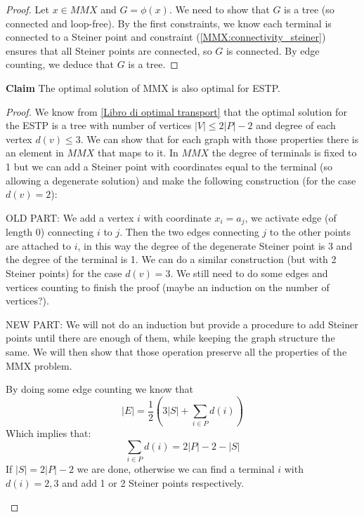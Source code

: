 \begin{proof}
    Let $x \in MMX$ and $G = \phi(x)$. We need to show that $G$ is a tree (so connected and loop-free).
    By the first constraints, we know each terminal is connected to a Steiner point and constraint (\ref{MMX:connectivity_steiner}) ensures that
    all Steiner points are connected, so $G$ is connected.
    By edge counting, we deduce that $G$ is a tree.
\end{proof}



\textbf{Claim} The optimal solution of MMX is also optimal for ESTP.

\begin{proof}
    We know from \ref{Libro di optimal transport} that the optimal solution for the ESTP is a tree with
    number of vertices $|V| \le 2|P| - 2$ and degree of each vertex $d(v) \le 3$.
    We can show that for each graph with those properties there is an element in $MMX$ that maps to it.
    In $MMX$ the degree of terminals is fixed to 1 but we can add a Steiner point with coordinates equal to the terminal
    (so allowing a degenerate solution) and make the following construction (for the case $d(v) = 2$):

    OLD PART:
    We add a vertex $i$ with coordinate $x_i = a_j$, we activate edge (of length 0) connecting $i$ to $j$. Then the two
    edges connecting $j$ to the other points are attached to $i$, in this way the degree of the degenerate Steiner point is
    3 and the degree of the terminal is 1.
    We can do a similar construction (but with 2 Steiner points) for the case $d(v) = 3$.
    We still need to do some edges and vertices counting to finish the proof (maybe an induction on the number of vertices?).

    NEW PART:
    We will not do an induction but provide a procedure to add Steiner points until there are enough of them, while keeping
    the graph structure the same. We will then show that those operation preserve all the properties of the MMX problem.

    By doing some edge counting we know that
    \begin{equation}
        |E| = \frac{1}{2} \left( 3|S| + \sum_{i \in P} d(i) \right)
    \end{equation}
    Which implies that:
    \begin{equation}
        \sum_{i \in P} d(i) = 2|P| - 2 - |S|
    \end{equation}
    If $|S| = 2|P| - 2$ we are done, otherwise we can find a terminal $i$ with $d(i) = 2,3$ and add 1 or 2 Steiner points respectively.
    \begin{itemize}


\end{itemize}
\end{proof}
